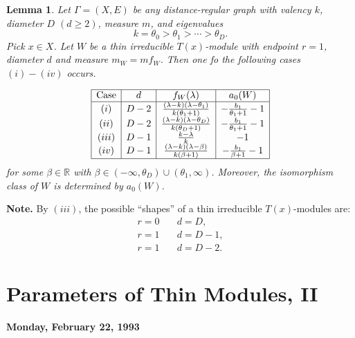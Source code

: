 \documentclass[
]{book}
\newtheorem{lemma}{Lemma}[chapter]
\theoremstyle{definition}
\theoremstyle{definition}
\theoremstyle{definition}
\theoremstyle{definition}
\theoremstyle{remark}
\begin{document}
\begin{lemma}
\protect\hypertarget{lem:thin-endpoint1}{}\label{lem:thin-endpoint1}Let \(\Gamma = (X, E)\) be any distance-regular graph with valency \(k\), diameter \(D\) \((d\geq 2)\), measure \(m\), and eigenvalues
\[k = \theta_0 > \theta_1 > \cdots > \theta_D.\]
Pick \(x\in X\). Let
\(W\) be a thin irreducible \(T(x)\)-module with endpoint \(r = 1\), diameter \(d\) and measure \(m_W = mf_W\).
Then one fo the following cases \((i)-(iv)\) occurs.

\[\begin{array}{|c|c|c|c|}
\hline
\text{Case} & d  & f_W(\lambda) & a_0(W) \\
\hline
(i) & D-2 & \frac{(\lambda - k)(\lambda - \theta_1)}{k(\theta_1 + 1)} & -\frac{b_1}{\theta_1 + 1} -1\\
(ii) & D-2 & \frac{(\lambda - k)(\lambda - \theta_D)}{k(\theta_D + 1)} & -\frac{b_1}{\theta_1 + 1} -1\\
(iii) & D-1 & \frac{k - \lambda}{k} & -1\\
(iv) & D-1 & \frac{(\lambda - k)(\lambda - \beta)}{k(\beta + 1)} & -\frac{b_1}{\beta + 1} -1\\ 
\hline
\end{array}\]
for some \(\beta\in \mathbb{R}\) with \(\beta\in (-\infty, \theta_D) \cup (\theta_1, \infty)\).
Moreover, the isomorphism class of \(W\) is determined by \(a_0(W)\).
\end{lemma}

\textbf{Note.} By \((iii)\), the possible ``shapes'' of a thin irreducible \(T(x)\)-modules are:
\begin{align}
r = 0 & \quad d = D,\\
r = 1 & \quad d = D-1,\\
r = 1 & \quad d = D-2.
\end{align}

\hypertarget{lec15}{%
\chapter{Parameters of Thin Modules, II}\label{lec15}}

\textbf{Monday, February 22, 1993}
\end{document}
